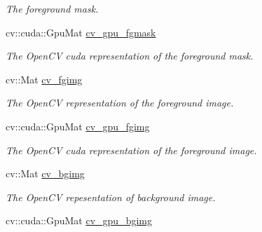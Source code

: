\begin{DoxyCompactItemize}
\begin{DoxyCompactList}\small\item\em The foreground mask. \end{DoxyCompactList}\item 
\mbox{\label{structdto_1_1_image_a84a1b1a563db9ca7a4a9b06f7770260f}} 
cv\+::cuda\+::\+Gpu\+Mat \mbox{\hyperlink{structdto_1_1_image_a84a1b1a563db9ca7a4a9b06f7770260f}{cv\+\_\+gpu\+\_\+fgmask}}
\begin{DoxyCompactList}\small\item\em The Open\+CV cuda representation of the foreground mask. \end{DoxyCompactList}\item 
\mbox{\label{structdto_1_1_image_aff738eb7e44add04b2b88949e2af3f60}} 
cv\+::\+Mat \mbox{\hyperlink{structdto_1_1_image_aff738eb7e44add04b2b88949e2af3f60}{cv\+\_\+fgimg}}
\begin{DoxyCompactList}\small\item\em The Open\+CV representation of the foreground image. \end{DoxyCompactList}\item 
\mbox{\label{structdto_1_1_image_acc776e85553f17667cbd07004225bd7b}} 
cv\+::cuda\+::\+Gpu\+Mat \mbox{\hyperlink{structdto_1_1_image_acc776e85553f17667cbd07004225bd7b}{cv\+\_\+gpu\+\_\+fgimg}}
\begin{DoxyCompactList}\small\item\em The Open\+CV cuda representation of the foreground image. \end{DoxyCompactList}\item 
\mbox{\label{structdto_1_1_image_a26db596e9b52e7d250988a171cdd6a75}} 
cv\+::\+Mat \mbox{\hyperlink{structdto_1_1_image_a26db596e9b52e7d250988a171cdd6a75}{cv\+\_\+bgimg}}
\begin{DoxyCompactList}\small\item\em The Open\+CV repesentation of background image. \end{DoxyCompactList}\item 
\mbox{\label{structdto_1_1_image_a78cae2a702af972d505bd4ab9f295c5f}} 
cv\+::cuda\+::\+Gpu\+Mat \mbox{\hyperlink{structdto_1_1_image_a78cae2a702af972d505bd4ab9f295c5f}{cv\+\_\+gpu\+\_\+bgimg}}

\end{DoxyCompactItemize}
